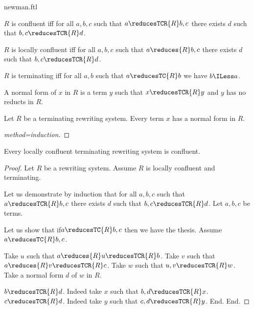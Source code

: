 \documentclass{stex}
\begin{document}
\begin{smodule}{newman.ftl}
\begin{forthel}
  \begin{definition}[title=Confluency]
    $R$ is confluent iff for all $a,b,c$ such that $a \reducesTCR{R} b,c$ there exists $d$ such that $b,c \reducesTCR{R} d$.
  \end{definition}

  \begin{definition}[title=Local Confluency]
    $R$ is locally confluent iff for all $a, b, c$ such that $a \reduces{R} b, c$   there exists $d$ such that $b, c \reducesTCR{R} d$.
  \end{definition}

  \begin{definition}[title=Termination]
    $R$ is terminating iff for all $a, b$ such that $a \reducesTC{R} b$ we have $b \ILess a$.
  \end{definition}

  \begin{definition}[title=Normal Form]
    A normal form of $x$ in $R$ is a term $y$ such that $x \reducesTCR{R} y$ and $y$ has no reducts in $R$.
  \end{definition}

  \begin{lemma}
    Let $R$ be a terminating rewriting system.
    Every term $x$ has a normal form in $R$.
  \end{lemma}
  \begin{proof}[method=induction]
  \end{proof}

  \begin{theorem}[title=Newman's Lemma,name=Newman]
    Every locally confluent terminating rewriting system is confluent.
  \end{theorem}
  \begin{proof}
    Let $R$ be a rewriting system.
    Assume $R$ is locally confluent and terminating.

    Let us demonstrate by induction that for all $a,b,c$ such that $a \reducesTCR{R} b,c$ there exists $d$ such that $b,c \reducesTCR{R} d$.
      Let $a,b,c$ be terms.

      Let us show that if$ a \reducesTC{R} b,c$ then we have the thesis.
        Assume $a \reducesTC{R} b,c$.
  
        Take $u$ such that $a \reduces{R} u \reducesTCR{R} b$.
        Take $v$ such that $a \reduces{R} v \reducesTCR{R} c$.
        Take $w$ such that $u,v \reducesTCR{R} w$.
        Take a normal form $d$ of $w$ in $R$.
  
        $b \reducesTCR{R} d$.
        Indeed take $x$ such that $b,d \reducesTCR{R} x$. 
        $c \reducesTCR{R} d$.
        Indeed take $y$ such that $c,d \reducesTCR{R} y$.
      End.
    End.
  \end{proof}
\end{forthel}

\end{smodule}
\end{document}
